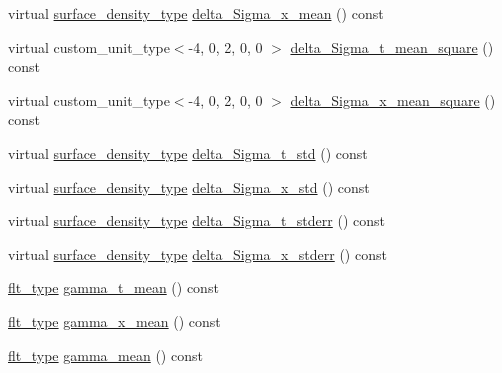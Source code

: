 \begin{DoxyCompactItemize}
virtual \hyperlink{namespaceIceBRG_a80c597ef5ba0a32491d32a9f0083b02d}{surface\-\_\-density\-\_\-type} \hyperlink{classIceBRG_1_1pair__bin__summary_a8e885aafb07552b829d1d75db54d93b4}{delta\-\_\-\-Sigma\-\_\-x\-\_\-mean} () const 
\item 
virtual custom\-\_\-unit\-\_\-type$<$-\/4, 0, 2, 0, 0 $>$ \hyperlink{classIceBRG_1_1pair__bin__summary_a752e84b6a079f91bbc64bfc746ec5b5d}{delta\-\_\-\-Sigma\-\_\-t\-\_\-mean\-\_\-square} () const 
\item 
virtual custom\-\_\-unit\-\_\-type$<$-\/4, 0, 2, 0, 0 $>$ \hyperlink{classIceBRG_1_1pair__bin__summary_aa16505e993ab66451519a9ed4304c9a8}{delta\-\_\-\-Sigma\-\_\-x\-\_\-mean\-\_\-square} () const 
\item 
virtual \hyperlink{namespaceIceBRG_a80c597ef5ba0a32491d32a9f0083b02d}{surface\-\_\-density\-\_\-type} \hyperlink{classIceBRG_1_1pair__bin__summary_acd510011670a535d609e4ecb2fa8257f}{delta\-\_\-\-Sigma\-\_\-t\-\_\-std} () const 
\item 
virtual \hyperlink{namespaceIceBRG_a80c597ef5ba0a32491d32a9f0083b02d}{surface\-\_\-density\-\_\-type} \hyperlink{classIceBRG_1_1pair__bin__summary_a1779c3cbeaa111f27727d70481fb7ff9}{delta\-\_\-\-Sigma\-\_\-x\-\_\-std} () const 
\item 
virtual \hyperlink{namespaceIceBRG_a80c597ef5ba0a32491d32a9f0083b02d}{surface\-\_\-density\-\_\-type} \hyperlink{classIceBRG_1_1pair__bin__summary_a61f9c6863d1a2440e8d8c7d794b3c8c5}{delta\-\_\-\-Sigma\-\_\-t\-\_\-stderr} () const 
\item 
virtual \hyperlink{namespaceIceBRG_a80c597ef5ba0a32491d32a9f0083b02d}{surface\-\_\-density\-\_\-type} \hyperlink{classIceBRG_1_1pair__bin__summary_a1063e8e122208a24b240fb1e669d786c}{delta\-\_\-\-Sigma\-\_\-x\-\_\-stderr} () const 
\item 
\hyperlink{lib_2IceBRG__main_2common_8h_ad0f130a56eeb944d9ef2692ee881ecc4}{flt\-\_\-type} \hyperlink{classIceBRG_1_1pair__bin__summary_a15002ebbfb7d5309d5dfb012bd7ceb81}{gamma\-\_\-t\-\_\-mean} () const 
\item 
\hyperlink{lib_2IceBRG__main_2common_8h_ad0f130a56eeb944d9ef2692ee881ecc4}{flt\-\_\-type} \hyperlink{classIceBRG_1_1pair__bin__summary_a01072e7fd074b2521332e3ccf466c1ae}{gamma\-\_\-x\-\_\-mean} () const 
\item 
\hyperlink{lib_2IceBRG__main_2common_8h_ad0f130a56eeb944d9ef2692ee881ecc4}{flt\-\_\-type} \hyperlink{classIceBRG_1_1pair__bin__summary_a845031aad82a6757c43a2199a059ce63}{gamma\-\_\-mean} () const 
\item 

\end{DoxyCompactItemize}
